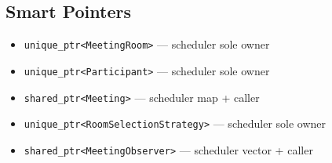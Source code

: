 \documentclass[11pt,a4paper]{article}
\begin{document}
\subsection{Smart Pointers}
\begin{itemize}
    \item \texttt{unique\_ptr<MeetingRoom>} --- scheduler sole owner
    \item \texttt{unique\_ptr<Participant>} --- scheduler sole owner
    \item \texttt{shared\_ptr<Meeting>} --- scheduler map + caller
    \item \texttt{unique\_ptr<RoomSelectionStrategy>} --- scheduler sole owner
    \item \texttt{shared\_ptr<MeetingObserver>} --- scheduler vector + caller
\end{itemize}

\newpage
\end{document}
